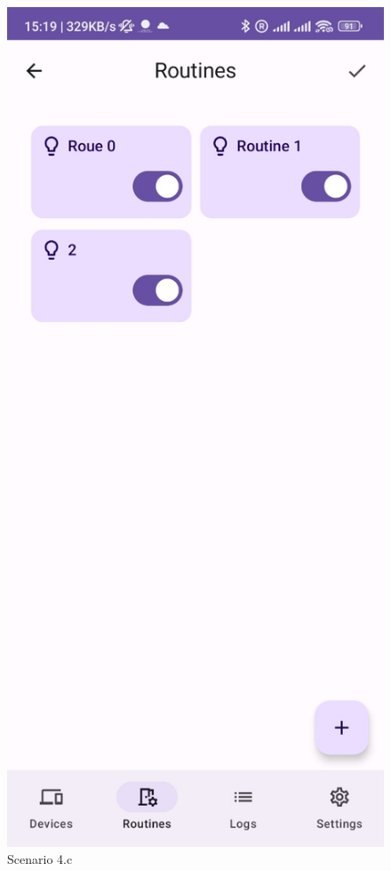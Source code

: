 \begin{enumerate}
\begin{enumerate}
\begin{figure}
            \includegraphics[width=0.5\linewidth]{imgs//usercase/scenario4-c.jpg}
            \caption{Scenario 4.c}
            \label{fig:enter-label}
        \end{figure}
    \end{enumerate}


\end{enumerate}
